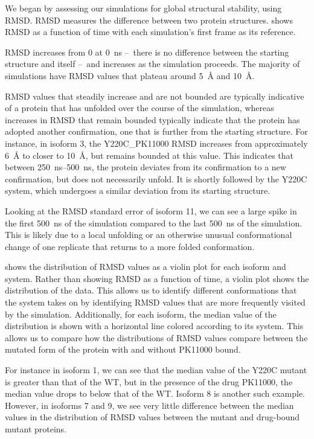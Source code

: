 We began by assessing our simulations for global structural stability, using RMSD. RMSD measures the difference between two protein structures.  shows RMSD as a function of time with each simulation's first frame as its reference.

RMSD increases from \num{0} at \qty{0}{\nano\second} – there is no difference between the starting structure and itself – and increases as the simulation proceeds. The majority of simulations have RMSD values that plateau around \qty{5}{\angstrom} and \qty{10}{\angstrom}.

RMSD values that steadily increase and are not bounded are typically indicative of a protein that has unfolded over the course of the simulation, whereas increases in RMSD that remain bounded typically indicate that the protein has adopted another confirmation, one that is further from the starting structure. For instance, in isoform \num{3}, the Y220C\_PK11000 RMSD increases from approximately \qty{6}{\angstrom} to closer to \qty{10}{\angstrom}, but remains bounded at this value. This indicates that between \qtyrange{250}{500}{\nano\second}, the protein deviates from its confirmation to a new confirmation, but does not necessarily unfold. It is shortly followed by the Y220C system, which undergoes a similar deviation from its starting structure. 

Looking at the RMSD standard error of isoform \num{11}, we can see a large spike in the first \qty{500}{\nano\second} of the simulation compared to the last \qty{500}{\nano\second} of the simulation. This is likely due to a local unfolding or an otherwise unusual conformational change of one replicate that returns to a more folded conformation.

 shows the distribution of RMSD values as a violin plot for each isoform and system. Rather than showing RMSD as a function of time, a violin plot shows the distribution of the data. This allows us to identify different conformations that the system takes on by identifying RMSD values that are more frequently visited by the simulation. Additionally, for each isoform, the median value of the distribution is shown with a horizontal line colored according to its system. This allows us to compare how the distributions of RMSD values compare between the mutated form of the protein with and without PK11000 bound.

For instance in isoform \num{1}, we can see that the median value of the Y220C mutant is greater than that of the WT, but in the presence of the drug PK11000, the median value drops to below that of the WT. Isoform \num{8} is another such example. However, in isoforms \num{7} and \num{9}, we see very little difference between the median values in the distribution of RMSD values between the mutant and drug-bound mutant proteins.


